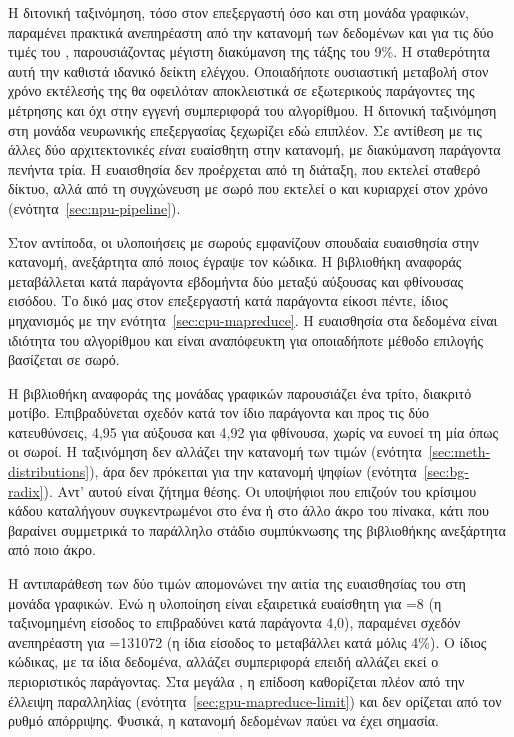 Η διτονική ταξινόμηση, τόσο στον επεξεργαστή όσο και στη μονάδα γραφικών,
παραμένει πρακτικά ανεπηρέαστη από την κατανομή των δεδομένων και για τις δύο
τιμές του , παρουσιάζοντας μέγιστη διακύμανση της τάξης του 9\%. Η
σταθερότητα αυτή την καθιστά ιδανικό δείκτη ελέγχου. Οποιαδήποτε ουσιαστική
μεταβολή στον χρόνο εκτέλεσής της θα οφειλόταν αποκλειστικά σε εξωτερικούς
παράγοντες της μέτρησης και όχι στην εγγενή συμπεριφορά του αλγορίθμου. Η
διτονική ταξινόμηση στη μονάδα νευρωνικής επεξεργασίας ξεχωρίζει εδώ επιπλέον.
Σε αντίθεση με τις άλλες δύο αρχιτεκτονικές \emph{είναι} ευαίσθητη στην
κατανομή, με διακύμανση παράγοντα πενήντα τρία. Η ευαισθησία δεν προέρχεται από
τη διάταξη, που εκτελεί σταθερό δίκτυο, αλλά από τη συγχώνευση με σωρό που
εκτελεί ο  και κυριαρχεί στον χρόνο (ενότητα~\ref{sec:npu-pipeline}).

Στον αντίποδα, οι υλοποιήσεις με σωρούς εμφανίζουν σπουδαία ευαισθησία στην
κατανομή, ανεξάρτητα από ποιος έγραψε τον κώδικα. Η βιβλιοθήκη αναφοράς
μεταβάλλεται κατά παράγοντα εβδομήντα δύο μεταξύ αύξουσας και φθίνουσας
εισόδου. Το δικό μας  στον επεξεργαστή κατά παράγοντα είκοσι
πέντε, ίδιος μηχανισμός με την ενότητα~\ref{sec:cpu-mapreduce}. Η ευαισθησία
στα δεδομένα είναι ιδιότητα του αλγορίθμου και είναι αναπόφευκτη για
οποιαδήποτε μέθοδο επιλογής βασίζεται σε σωρό.

Η βιβλιοθήκη αναφοράς της μονάδας γραφικών παρουσιάζει ένα τρίτο, διακριτό
μοτίβο. Επιβραδύνεται σχεδόν κατά τον ίδιο παράγοντα και προς τις δύο
κατευθύνσεις, 4,95 για αύξουσα και 4,92 για φθίνουσα, χωρίς να ευνοεί τη μία
όπως οι σωροί. Η ταξινόμηση δεν αλλάζει την κατανομή των τιμών
(ενότητα~\ref{sec:meth-distributions}), άρα δεν πρόκειται για την
 κατανομή ψηφίων (ενότητα~\ref{sec:bg-radix}). Αντ' αυτού
είναι ζήτημα θέσης. Οι υποψήφιοι που επιζούν του κρίσιμου κάδου καταλήγουν
συγκεντρωμένοι στο ένα ή στο άλλο άκρο του πίνακα, κάτι που βαραίνει συμμετρικά
το παράλληλο στάδιο συμπύκνωσης της βιβλιοθήκης ανεξάρτητα από ποιο άκρο.

Η αντιπαράθεση των δύο τιμών  απομονώνει την αιτία της ευαισθησίας του
 στη μονάδα γραφικών. Ενώ η υλοποίηση είναι εξαιρετικά ευαίσθητη
για =8 (η ταξινομημένη είσοδος το επιβραδύνει κατά παράγοντα 4,0),
παραμένει σχεδόν ανεπηρέαστη για =131072 (η ίδια είσοδος το μεταβάλλει
κατά μόλις 4\%). Ο ίδιος κώδικας, με τα ίδια δεδομένα, αλλάζει συμπεριφορά
επειδή αλλάζει εκεί ο περιοριστικός παράγοντας. Στα μεγάλα , η επίδοση
καθορίζεται πλέον από την έλλειψη παραλληλίας
(ενότητα~\ref{sec:gpu-mapreduce-limit}) και δεν ορίζεται από τον ρυθμό
απόρριψης. Φυσικά, η κατανομή δεδομένων παύει να έχει σημασία.

